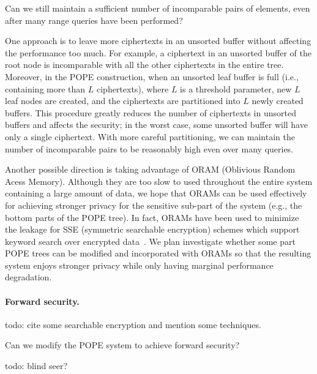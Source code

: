 \begin{question}
Can we still maintain a sufficient number of incomparable pairs of elements, even after
  many range queries have been performed?  
\end{question}

One approach is to leave more ciphertexts in an unsorted buffer without
affecting the performance too much. For example, a ciphertext in an unsorted
buffer of the root node is incomparable with all the other ciphertexts in the
entire tree.  Moreover, in the POPE construction, when an unsorted leaf buffer
is full (i.e.,  containing more than $L$ ciphertexts), where $L$ is a threshold
parameter, new $L$ leaf nodes are created, and the ciphertexts are partitioned
into $L$ newly created buffers. This procedure greatly reduces the number of
ciphertexts in unsorted buffers and affects the security; in the worst case,
some unsorted buffer will have only a single ciphertext. With more careful
partitioning, we can maintain the number of incomparable pairs to be reasonably
high even over many queries. 


Another possible direction is taking advantage of ORAM (Oblivious Random Acess
Memory). Although they are too slow to used throughout the entire system
containing a large amount of data, we hope that ORAMs can be used effectively
for achieving stronger privacy for the sensitive sub-part of the system (e.g.,
the bottom parts of the POPE tree).  In fact, ORAMs have been used to minimize
the leakage for SSE (symmetric searchable encryption) schemes which support
keyword search over encrypted data~\cite{NDSS:StePapShi14,C:GarMohPap16}. We
plan investigate whether some part POPE trees can be modified and incorporated
with ORAMs so that the resulting system enjoys stronger privacy while only
having marginal performance degradation.  

\paragraph{Forward security.} todo: cite some searchable encryption and mention some techniques. 

\begin{question}
Can we modify the POPE system to achieve forward security?
\end{question}


todo: blind seer?
